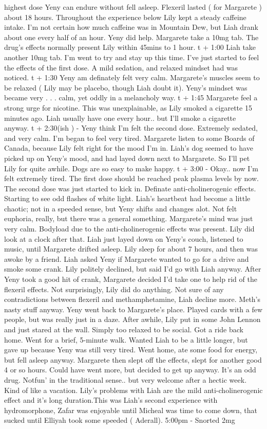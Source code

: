 \documentclass[12pt]{book}
\begin{document}
highest dose Yeny can endure without fell asleep. Flexeril lasted ( for Margarete ) about 18 hours. Throughout the experience below Lily kept a steady caffeine intake. I'm not certain how much caffeine was in Mountain Dew, but Liah drank about one every half of an hour. Yeny did help. Margarete take a 10mg tab. The drug's effects normally present Lily within 45mins to 1 hour. t + 1:00 Liah take another 10mg tab. I'm went to try and stay up this time. I've just started to feel the effects of the first dose. A mild sedation, and relaxed mindset had was noticed. t + 1:30 Yeny am definately felt very calm. Margarete's muscles seem to be relaxed ( Lily may be placebo, though Liah doubt it). Yeny's mindset was became very . . .  calm, yet oddly in a melancholy way. t + 1:45 Margarete feel a strong urge for nicotine. This was unexplainable, as Lily smoked a cigarette 15 minutes ago. Liah usually have one every hour.. but I'll smoke a cigarette anyway. t + 2:30(ish ) - Yeny think I'm felt the second dose. Extremely sedated, and very calm. I'm began to feel very tired. Margarete listen to some Boards of Canada, because Lily felt right for the mood I'm in. Liah's dog seemed to have picked up on Yeny's mood, and had layed down next to Margarete. So I'll pet Lily for quite awhile. Dogs are so easy to make happy. t + 3:00 - Okay.. now I'm felt extremely tired. The first dose should be reached peak plasma levels by now. The second dose was just started to kick in. Definate anti-cholinerogenic effects. Starting to see odd flashes of white light. Liah's heartbeat had become a little chaotic; not in a speeded sense, but Yeny shifts and changes alot. Not felt euphoria, really, but there was a general something. Margarete's mind was just very calm. Bodyload due to the anti-cholinerogenic effects was present. Lily did look at a clock after that. Liah just layed down on Yeny's couch, listened to music, until Margarete drifted asleep. Lily sleep for about 7 hours, and then was awoke by a friend. Liah asked Yeny if Margarete wanted to go for a drive and smoke some crank. Lily politely declined, but said I'd go with Liah anyway. After Yeny took a good hit of crank, Margarete decided I'd take one to help rid of the flexeril effects. Not surprisingly, Lily did do anything. Not sure of any contradictions between flexeril and methamphetamine, Liah decline more. Meth's nasty stuff anyway. Yeny went back to Margarete's place. Played cards with a few people, but was really just in a daze. After awhile, Lily put in some John Lennon and just stared at the wall. Simply too relaxed to be social. Got a ride back home. Went for a brief, 5-minute walk. Wanted Liah to be a little longer, but gave up because Yeny was still very tired. Went home, ate some food for energy, but fell asleep anyway. Margarete then slept off the effects, slept for another good 4 or so hours. Could have went more, but decided to get up anyway. It's an odd drug. Notfun' in the traditional sense.. but very welcome after a hectic week. Kind of like a vacation. Lily's problems with Liah are the mild anti-cholinerogenic effect and it's long duration.This was Liah's second experience with hydromorphone, Zafar was enjoyable until Micheal was time to come down, that sucked until Elliyah took some speeded ( Aderall). 5:00pm - Snorted 2mg 
\end{document}
